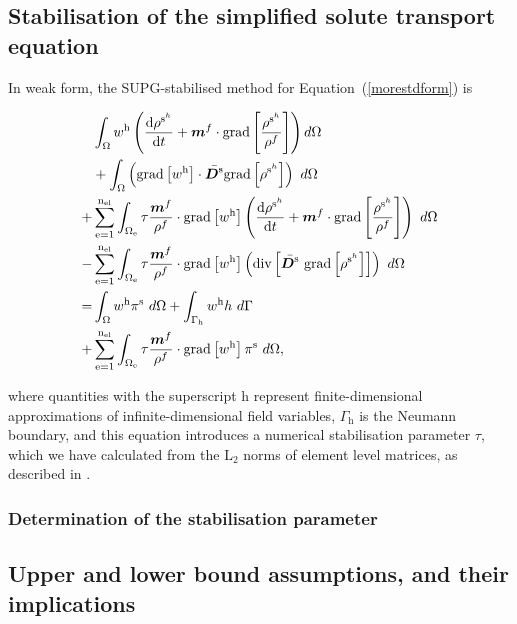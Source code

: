 \subsection{Stabilisation of the simplified solute transport equation}
\label{stabilisation-solute-transport}

In weak form, the SUPG-stabilised method for
Equation~(\ref{morestdform}) is

\begin{equation}
\begin{split}
&\int_{\Omega} w^{\mathrm{h}} \left(
  \frac{\mathrm{d}\rho^{\mathrm{s}^{h}}}{\mathrm{d}t} +
  \mbox{\boldmath$ m$}^f\cdot\mathrm{grad}\left[\frac{
      \rho^{\mathrm{s}^{h}}}{\rho^f}\right] \right)
  d\Omega\\ &+\int_{\Omega} \left( \mathrm{grad}
  \left[w^{\mathrm{h}}\right] \cdot \bar{\mbox{\boldmath$ D$}^\mathrm{s}} \mathrm{grad}
  \left[ \rho^{\mathrm{s}^{h}}\right] \right)\ d\Omega\\ +&
  \sum_{\mathrm{e}=1}^{\mathrm{n_{el}}} \int_{\Omega_{\mathrm{e}}}
  \tau \frac{\mbox{\boldmath$ m$}^{f}}{\rho^f} \cdot \mathrm{grad} \left[w^{\mathrm{h}}\right] \left(
  \frac{\mathrm{d}\rho^{\mathrm{s}^{h}}}{\mathrm{d}t} +
  \mbox{\boldmath$ m$}^f\cdot\mathrm{grad}\left[\frac{
      \rho^{\mathrm{s}^{h}}}{\rho^f}\right] \right) \ d\Omega\\ -&
  \sum_{\mathrm{e}=1}^{\mathrm{n_{el}}} \int_{\Omega_{\mathrm{e}}}
  \tau \frac{\mbox{\boldmath$ m$}^{f}}{\rho^f} \cdot \mathrm{grad} \left[w^{\mathrm{h}}\right]
  \left(\mathrm{div}\left[\bar{\mbox{\boldmath$ D$}^\mathrm{s}}\ \mathrm{grad} \left[
      \rho^{\mathrm{s}^{h}}\right]\right]\right) \ d\Omega\\ = &
  \int_{\Omega} w^{\mathrm{h}} \pi^\mathrm{s} \ d\Omega +
  \int_{\Gamma_{\mathrm{h}}} w^{\mathrm{h}} h \ d\Gamma\\ +&
  \sum_{\mathrm{e}=1}^{\mathrm{n_{el}}} \int_{\Omega_{\mathrm{e}}}
  \tau \frac{\mbox{\boldmath$ m$}^{f}}{\rho^f} \cdot \mathrm{grad} \left[w^{\mathrm{h}}\right]
  \pi^\mathrm{s} \ d\Omega,
\label{stabilizedmassbal}
\end{split}
\end{equation}

\noindent where quantities with the superscript $\mathrm{h}$ represent
finite-di\-men\-sion\-al approximations of infinite-dimensional field
variables, $\Gamma_{\mathrm{h}}$ is the Neumann boundary, and 
this equation introduces a numerical stabilisation parameter $\tau$,
which we have calculated from the $\mathrm{L}_{2}$ norms of element
level matrices, as described in
\cite{tezduyarsupg}.

\subsubsection{Determination of the stabilisation parameter}
\label{}

\subsection{Upper and lower bound assumptions, and their implications}
\label{}

%

